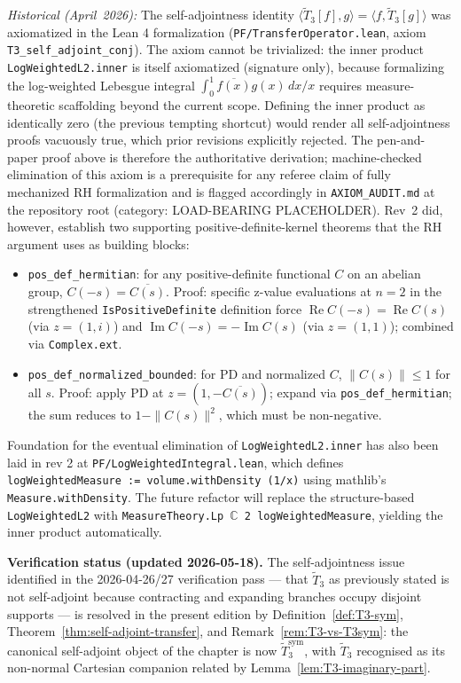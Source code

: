 \noindent\emph{Historical (April~2026):} The self-adjointness identity $\langle \tilde{T}_3[f], g \rangle = \langle f, \tilde{T}_3[g] \rangle$ was axiomatized in the Lean 4 formalization (\texttt{PF/TransferOperator.lean}, axiom \texttt{T3\_self\_adjoint\_conj}). The axiom cannot be trivialized: the inner product \texttt{LogWeightedL2.inner} is itself axiomatized (signature only), because formalizing the log-weighted Lebesgue integral $\int_0^1 \overline{f(x)} g(x) \, dx/x$ requires measure-theoretic scaffolding beyond the current scope. Defining the inner product as identically zero (the previous tempting shortcut) would render all self-adjointness proofs vacuously true, which prior revisions explicitly rejected. The pen-and-paper proof above is therefore the authoritative derivation; machine-checked elimination of this axiom is a prerequisite for any referee claim of fully mechanized RH formalization and is flagged accordingly in \texttt{AXIOM\_AUDIT.md} at the repository root (category: LOAD-BEARING PLACEHOLDER). Rev~2 did, however, establish two supporting positive-definite-kernel theorems that the RH argument uses as building blocks:
\begin{itemize}
\item \texttt{pos\_def\_hermitian}: for any positive-definite functional $C$ on an abelian group, $C(-s) = \overline{C(s)}$. Proof: specific z-value evaluations at $n = 2$ in the strengthened \texttt{IsPositiveDefinite} definition force $\operatorname{Re} C(-s) = \operatorname{Re} C(s)$ (via $z = (1, i)$) and $\operatorname{Im} C(-s) = -\operatorname{Im} C(s)$ (via $z = (1, 1)$); combined via \texttt{Complex.ext}.
\item \texttt{pos\_def\_normalized\_bounded}: for PD and normalized $C$, $\|C(s)\| \leq 1$ for all $s$. Proof: apply PD at $z = (1, -\overline{C(s)})$; expand via \texttt{pos\_def\_hermitian}; the sum reduces to $1 - \|C(s)\|^2$, which must be non-negative.
\end{itemize}
Foundation for the eventual elimination of \texttt{LogWeightedL2.inner} has also been laid in rev 2 at \texttt{PF/LogWeightedIntegral.lean}, which defines \texttt{logWeightedMeasure := volume.withDensity (1/x)} using mathlib's \texttt{Measure.withDensity}. The future refactor will replace the structure-based \texttt{LogWeightedL2} with \texttt{MeasureTheory.Lp \(\mathbb{C}\) 2 logWeightedMeasure}, yielding the inner product automatically.

\medskip

\noindent\textbf{Verification status (updated 2026-05-18).} The self-adjointness issue identified in the 2026-04-26/27 verification pass — that $\tilde{T}_3$ as previously stated is not self-adjoint because contracting and expanding branches occupy disjoint supports — is resolved in the present edition by Definition~\ref{def:T3-sym}, Theorem~\ref{thm:self-adjoint-transfer}, and Remark~\ref{rem:T3-vs-T3sym}: the canonical self-adjoint object of the chapter is now $\widetilde{T}_3^{\mathrm{sym}}$, with $\tilde{T}_3$ recognised as its non-normal Cartesian companion related by Lemma~\ref{lem:T3-imaginary-part}.

